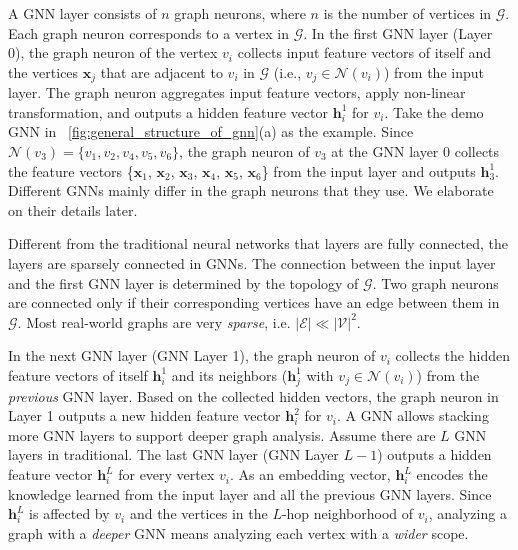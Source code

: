 A GNN layer consists of $n$ graph neurons, where $n$ is the number of vertices in $\mathcal{G}$.
Each graph neuron corresponds to a vertex in $\mathcal{G}$.
In the first GNN layer (Layer 0), the graph neuron of the vertex $v_i$ collects input feature vectors of itself and the vertices $\boldsymbol{x}_j$ that are adjacent to $v_i$ in $\mathcal{G}$ (i.e., $v_j \in \mathcal{N}(v_i)$) from the input layer.
The graph neuron aggregates input feature vectors, apply non-linear transformation, and outputs a hidden feature vector $\boldsymbol{h}^1_i$ for $v_i$.
Take the demo GNN in \figurename~\ref{fig:general_structure_of_gnn}(a) as the example.
Since $\mathcal{N}(v_3) = \{v_1, v_2, v_4, v_5, v_6\}$, the graph neuron of $v_3$ at the GNN layer 0 collects the feature vectors \{$\boldsymbol{x}_1$, $\boldsymbol{x}_2$, $\boldsymbol{x}_3$, $\boldsymbol{x}_4$, $\boldsymbol{x}_5$, $\boldsymbol{x}_6$\} from the input layer and outputs $\boldsymbol{h}^1_3$.
Different GNNs mainly differ in the graph neurons that they use.
We elaborate on their details later.

Different from the traditional neural networks that layers are fully connected, the layers are sparsely connected in GNNs. 
The connection between the input layer and the first GNN layer is determined by the topology of $\mathcal{G}$.
Two graph neurons are connected only if their corresponding vertices have an edge between them in $\mathcal{G}$.
Most real-world graphs are very \emph{sparse}, i.e. $|\mathcal{E}| \ll |\mathcal{V}|^2$.

In the next GNN layer (GNN Layer 1), the graph neuron of $v_i$ collects the hidden feature vectors of itself $\boldsymbol{h}^1_i$ and its neighbors ($\boldsymbol{h}^1_j$ with $v_j \in \mathcal{N}(v_i)$) from the \emph{previous} GNN layer.
Based on the collected hidden vectors, the graph neuron in Layer 1 outputs a new hidden feature vector $\boldsymbol{h}^2_i$ for $v_i$.
A GNN allows stacking more GNN layers to support deeper graph analysis.
Assume there are $L$ GNN layers in traditional.
The last GNN layer (GNN Layer $L-1$) outputs a hidden feature vector $\boldsymbol{h}^{L}_i$ for every vertex $v_i$.
As an embedding vector, $\boldsymbol{h}^L_i$ encodes the knowledge learned from the input layer and all the previous GNN layers.
Since $\boldsymbol{h}^L_i$ is affected by $v_i$ and the vertices in the $L$-hop neighborhood of $v_i$, analyzing a graph with a \emph{deeper} GNN means analyzing each vertex with a \emph{wider} scope.

